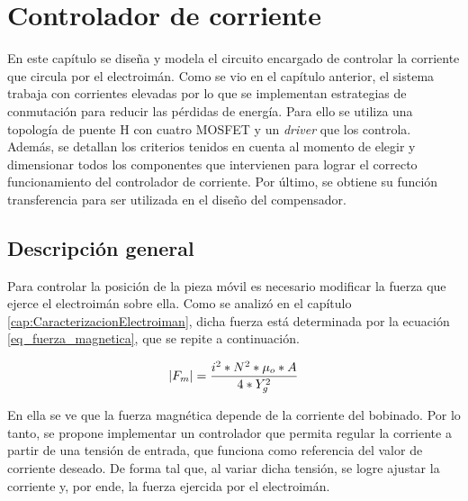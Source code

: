 \chapter{Controlador de corriente}  \label{cap:ControladorCorriente}

En este capítulo se diseña y modela el circuito encargado de controlar la corriente que circula por el electroimán. Como se vio en el capítulo anterior, el sistema trabaja con corrientes elevadas por lo que se implementan estrategias de conmutación para reducir las pérdidas de energía. Para ello se utiliza una topología de puente H con cuatro MOSFET y un \textsl{driver} que los controla. Además, se detallan los criterios tenidos en cuenta al momento de  elegir  y dimensionar todos los componentes que intervienen para lograr el correcto funcionamiento del controlador de corriente. Por último, se obtiene su función transferencia  para ser utilizada en el diseño del compensador.

\section{Descripción general}\label{sec_descripcion-general}

Para controlar la posición de la pieza móvil es necesario modificar la fuerza que ejerce el electroimán sobre ella. Como se analizó en el capítulo \ref{cap:CaracterizacionElectroiman}, dicha fuerza está determinada por la ecuación \ref{eq_fuerza_magnetica}, que se repite a continuación. 

\begin{equation*}
	\lvert F_{m}\rvert=\frac{i^{2}*N^{2}*\mu_{o}*A}{4*Y_{g}^{2}}
\end{equation*}

En ella se ve que la fuerza magnética depende de la corriente del bobinado. Por lo tanto, se propone implementar un controlador que permita regular la corriente a partir de una tensión de entrada, que funciona como referencia del valor de corriente deseado. De forma tal que, al variar dicha tensión, se logre ajustar la corriente y, por ende, la fuerza ejercida por el electroimán.


